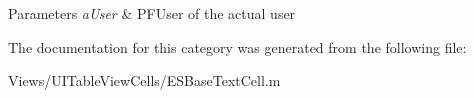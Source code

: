 \begin{DoxyParams}{Parameters}
{\em a\+User} & P\+F\+User of the actual user \\
\hline
\end{DoxyParams}


The documentation for this category was generated from the following file\+:\begin{DoxyCompactItemize}
\item 
Views/\+U\+I\+Table\+View\+Cells/E\+S\+Base\+Text\+Cell.\+m\end{DoxyCompactItemize}
